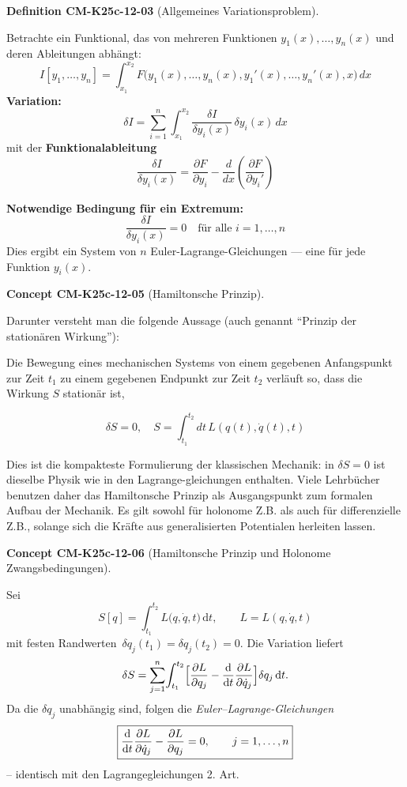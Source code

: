 \documentclass[10pt, letterpaper]{article}
\newcommand{\CustomHeading}[3]{%
  \par\medskip\noindent%
  \textbf{#1 #2} \textnormal{(#3)}.\enskip%
}
\newenvironment{DEF}[2]{\CustomHeading{Definition}{#1}{#2}}{}
\newenvironment{CONC}[2]{\CustomHeading{Concept}{#1}{#2}}{}
\begin{document}
\begin{DEF}{CM-K25c-12-03}{Allgemeines Variationsproblem}
Betrachte ein Funktional, das von mehreren Funktionen \( y_1(x), \dots, y_n(x) \) und deren Ableitungen abhängt:
\[
I[y_1,\dots,y_n] = \int_{x_1}^{x_2} F\big(y_1(x),\dots,y_n(x),y_1'(x),\dots,y_n'(x),x\big)\, dx
\]
\textbf{Variation:}
\[
\delta I = \sum_{i=1}^n \int_{x_1}^{x_2} \frac{\delta I}{\delta y_i(x)}\, \delta y_i(x)\, dx
\]
mit der \textbf{Funktionalableitung}
\[
\frac{\delta I}{\delta y_i(x)} = \frac{\partial F}{\partial y_i} - \frac{d}{dx} \left( \frac{\partial F}{\partial y_i'} \right)
\]

\vspace{0.5em}
\textbf{Notwendige Bedingung für ein Extremum:}
\[
\boxed{
\frac{\delta I}{\delta y_i(x)} = 0 \quad \text{für alle } i = 1,\dots,n
}
\]
Dies ergibt ein System von \( n \) Euler-Lagrange-Gleichungen — eine für jede Funktion \( y_i(x) \).
\end{DEF}

\begin{CONC}{CM-K25c-12-05}{Hamiltonsche Prinzip}
Darunter versteht man die folgende Aussage (auch genannt ``Prinzip der stationären Wirkung''):

Die Bewegung eines mechanischen Systems von einem gegebenen Anfangspunkt zur Zeit $t_1$ zu einem gegebenen Endpunkt zur Zeit $t_2$ verläuft so, dass die Wirkung $S$ stationär ist,

\[\delta S = 0, \quad S = \int_{t_1}^{t_2} dt\, L(q(t), \dot{q}(t), t)\]

Dies ist die kompakteste Formulierung der klassischen Mechanik: in $\delta S = 0$ ist dieselbe Physik wie in den Lagrange-gleichungen enthalten. Viele Lehrbücher benutzen daher das Hamiltonsche Prinzip als Ausgangspunkt zum formalen Aufbau der Mechanik. Es gilt sowohl für holonome Z.B. als auch für differenzielle Z.B., solange sich die Kräfte aus generalisierten Potentialen herleiten lassen.
\end{CONC}

\begin{CONC}{CM-K25c-12-06}{Hamiltonsche Prinzip und Holonome Zwangsbedingungen}
Sei
\[
  S[q]=\int_{t_1}^{t_2} L\bigl(q,\dot q,t\bigr)\,\mathrm dt,
  \qquad
  L=L(q,\dot q,t)
\]
mit festen Randwerten
$\,\delta q_j(t_1)=\delta q_j(t_2)=0$.  
Die Variation liefert
\[
  \delta S
  =\sum_{j=1}^{n}\!
     \int_{t_1}^{t_2}
       \Bigl[
         \frac{\partial L}{\partial q_j}
        -\frac{\mathrm d}{\mathrm dt}
          \frac{\partial L}{\partial\dot q_j}
       \Bigr]
       \delta q_j\,\mathrm dt .
\]
Da die $\delta q_j$ unabhängig sind, folgen die
\emph{Euler–Lagrange-Gleichungen}
\[
  \boxed{%
    \frac{\mathrm d}{\mathrm dt}
      \frac{\partial L}{\partial\dot q_j}
    -\frac{\partial L}{\partial q_j}=0,
    \qquad j=1,\dots,n } 
\]
– identisch mit den Lagrangegleichungen 2. Art.
\end{CONC}
\end{document}
